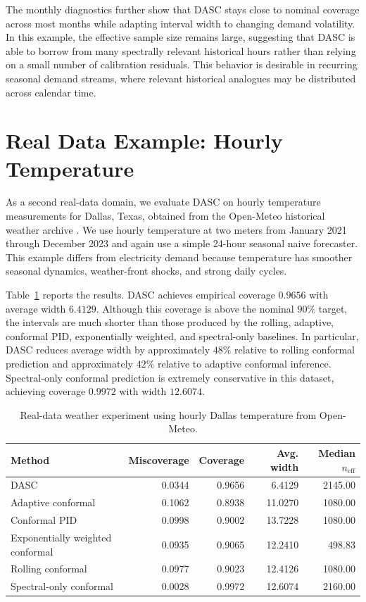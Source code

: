\documentclass[11pt]{article}
\begin{document}
The monthly diagnostics further show that DASC stays close to nominal coverage across most months while adapting interval width to changing demand volatility. In this example, the effective sample size remains large, suggesting that DASC is able to borrow from many spectrally relevant historical hours rather than relying on a small number of calibration residuals. This behavior is desirable in recurring seasonal demand streams, where relevant historical analogues may be distributed across calendar time.

\section{Real Data Example: Hourly Temperature}

As a second real-data domain, we evaluate DASC on hourly temperature measurements for Dallas, Texas, obtained from the Open-Meteo historical weather archive \citep{open_meteo}. We use hourly temperature at two meters from January 2021 through December 2023 and again use a simple 24-hour seasonal naive forecaster. This example differs from electricity demand because temperature has smoother seasonal dynamics, weather-front shocks, and strong daily cycles.

Table~\ref{tab:real-weather} reports the results. DASC achieves empirical coverage $0.9656$ with average width $6.4129$. Although this coverage is above the nominal $90\%$ target, the intervals are much shorter than those produced by the rolling, adaptive, conformal PID, exponentially weighted, and spectral-only baselines. In particular, DASC reduces average width by approximately $48\%$ relative to rolling conformal prediction and approximately $42\%$ relative to adaptive conformal inference. Spectral-only conformal prediction is extremely conservative in this dataset, achieving coverage $0.9972$ with width $12.6074$.

\begin{table}[t]
\centering
\caption{Real-data weather experiment using hourly Dallas temperature from Open-Meteo.}
\label{tab:real-weather}
\begin{tabular}{lrrrr}
\toprule
Method & Miscoverage & Coverage & Avg. width & Median $n_{\mathrm{eff}}$ \\
\midrule
DASC & 0.0344 & 0.9656 & 6.4129 & 2145.00 \\
Adaptive conformal & 0.1062 & 0.8938 & 11.0270 & 1080.00 \\
Conformal PID & 0.0998 & 0.9002 & 13.7228 & 1080.00 \\
Exponentially weighted conformal & 0.0935 & 0.9065 & 12.2410 & 498.83 \\
Rolling conformal & 0.0977 & 0.9023 & 12.4126 & 1080.00 \\
Spectral-only conformal & 0.0028 & 0.9972 & 12.6074 & 2160.00 \\
\bottomrule
\end{tabular}
\end{table}
\end{document}
